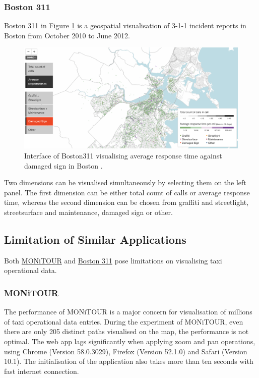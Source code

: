 \documentclass[doc,natbib]{apa6}
\begin{document}
\subsubsection{Boston 311}\label{sec:boston311}\hfil\newline
Boston 311 \citep{Boston311} in Figure \ref{fig:10} is a geospatial visualisation of 3-1-1 incident reports in Boston from October 2010 to June 2012. 
\begin{figure}[H]
	\centering
	\includegraphics[width=\textwidth,keepaspectratio]{figures/fig10.png}
	\caption{\label{fig:10}Interface of Boston311 visualising average response time against damaged sign in Boston \citep{Boston311}.}
\end{figure}

Two dimensions can be visualised simultaneously by selecting them on the left panel. The first dimension can be either total count of calls or average response time, whereas the second dimension can be chosen from graffiti and streetlight, streetsurface and maintenance, damaged sign or other.

\subsection{Limitation of Similar Applications}
Both \hyperref[sec:monitour]{MONiTOUR} and \hyperref[sec:boston311]{Boston 311} pose limitations on visualising taxi operational data. 

\subsubsection{MONiTOUR}\hfil\newline
The performance of MONiTOUR is a major concern for visualisation of millions of taxi operational data entries. During the experiment of MONiTOUR, even there are only 205 distinct paths visualised on the map, the performance is not optimal. The web app lags significantly when applying zoom and pan operations, using Chrome (Version 58.0.3029), Firefox (Version 52.1.0) and Safari (Version 10.1). The initialisation of the application also takes more than ten seconds with fast internet connection.
\end{document}
